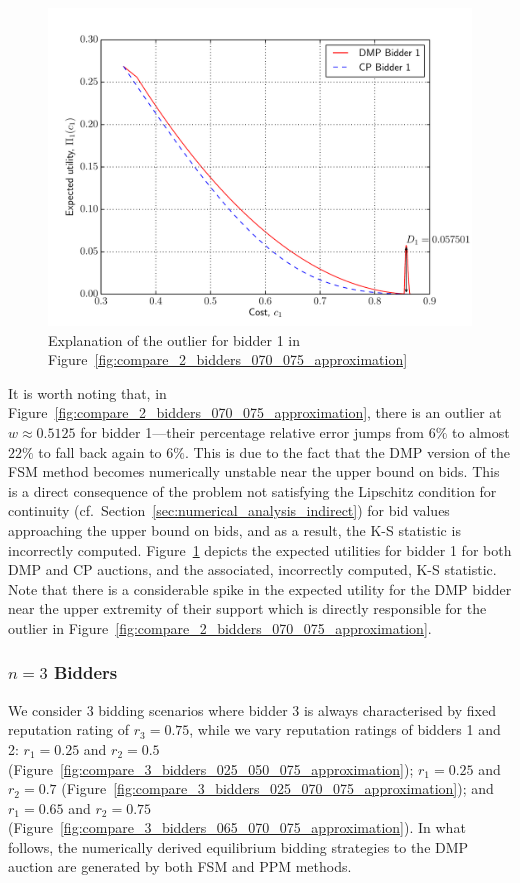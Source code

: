 \begin{figure}[p!]
  \includegraphics[width=\figsize]{Approximation/Figures/compare_2_bidders_070_075_outlier}
  \caption{Explanation of the outlier for bidder 1 in Figure~\ref{fig:compare_2_bidders_070_075_approximation}}
  \label{fig:compare_2_bidders_070_075_outlier_approximation}
\end{figure}

It is worth noting that, in Figure~\ref{fig:compare_2_bidders_070_075_approximation}, there is an outlier at $w\approx 0.5125$ for bidder 1---their percentage relative error jumps from $6\%$ to almost $22\%$ to fall back again to $6\%$. This is due to the fact that the DMP version of the FSM method becomes numerically unstable near the upper bound on bids. This is a direct consequence of the problem not satisfying the Lipschitz condition for continuity (cf.~Section~\ref{sec:numerical_analysis_indirect}) for bid values approaching the upper bound on bids, and as a result, the K-S statistic is incorrectly computed. Figure~\ref{fig:compare_2_bidders_070_075_outlier_approximation} depicts the expected utilities for bidder 1 for both DMP and CP auctions, and the associated, incorrectly computed, K-S statistic. Note that there is a considerable spike in the expected utility for the DMP bidder near the upper extremity of their support which is directly responsible for the outlier in Figure~\ref{fig:compare_2_bidders_070_075_approximation}.

\subsubsection{$n=3$ Bidders} %
\label{ssub:n_3_bidders_approximation}
We consider 3 bidding scenarios where bidder 3 is always characterised by fixed reputation rating of $r_3=0.75$, while we vary reputation ratings of bidders 1 and 2: $r_1=0.25$ and $r_2=0.5$ (Figure~\ref{fig:compare_3_bidders_025_050_075_approximation}); $r_1=0.25$ and $r_2=0.7$ (Figure~\ref{fig:compare_3_bidders_025_070_075_approximation}); and $r_1=0.65$ and $r_2=0.75$ (Figure~\ref{fig:compare_3_bidders_065_070_075_approximation}). In what follows, the numerically derived equilibrium bidding strategies to the DMP auction are generated by both FSM and PPM methods.

